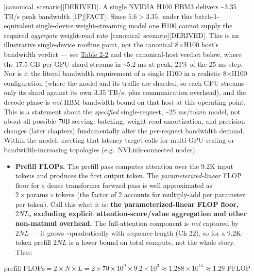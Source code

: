 \mbox{{[}canonical scenario{]}}\hspace{0pt}\mbox{{[}DERIVED{]}}. A single NVIDIA H100 HBM3
delivers \textasciitilde3.35 TB/s peak bandwidth \mbox{{[}1P{]}}\hspace{0pt}\mbox{{[}FACT{]}}.
Since \(5.6 > 3.35\), under this batch-1-equivalent single-device
weight-streaming model one H100 cannot supply the required
\emph{aggregate} weight-read rate \mbox{{[}canonical scenario{]}}\hspace{0pt}\mbox{{[}DERIVED{]}}.
This is an illustrative single-device roofline point, not the canonical
8×H100 host's bandwidth verdict --- see \hyperref[tab:2.2]{Table 2-2} and the canonical-host
verdict below, where the 17.5 GB per-GPU shard streams in
\textasciitilde5.2 ms at peak, 21\% of the 25 ms step. Nor is it the
literal bandwidth requirement of a single H100 in a realistic 8×H100
configuration (where the model and its traffic are sharded, so each GPU
streams only its shard against its own 3.35 TB/s, plus communication
overhead), and the decode phase is \emph{not} HBM-bandwidth-bound on
that host at this operating point. This is a statement about the
\emph{specified} single-request, \textasciitilde25 ms/token model, not
about all possible 70B serving: batching, weight-read amortization, and
precision changes (later chapters) fundamentally alter the per-request
bandwidth demand. Within the model, meeting that latency target calls
for multi-GPU scaling or bandwidth-increasing topologies
(e.g.~NVLink-connected nodes).

\begin{itemize}
\tightlist
\item
  \textbf{Prefill FLOPs.} The prefill pass computes attention over the
  9.2K input tokens and produces the first output token. The
  \emph{parameterized-linear} FLOP floor for a dense transformer forward
  pass is well approximated as
  \(2 \times \text{params} \times \text{tokens}\) (the factor of 2
  accounts for multiply-add per parameter per token). Call this what it
  is: \textbf{the parameterized-linear FLOP floor, \(2NL\), excluding
  explicit attention-score/value aggregation and other non-matmul
  overhead.} The full-attention component is \emph{not} captured by
  \(2NL\) --- it grows \textasciitilde quadratically with sequence
  length (Ch 22), so for a 9.2K-token prefill \(2NL\) is a lower bound
  on total compute, not the whole story. Thus:
\end{itemize}

\[
\text{prefill FLOPs} = 2 \times N \times L = 2 \times 70 \times 10^9 \times 9.2 \times 10^3 \approx 1.288 \times 10^{15} \approx 1.29 \text{ PFLOP}
\]

